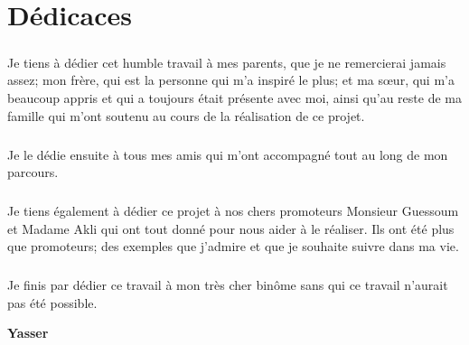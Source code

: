 \chapter*{Dédicaces}    

\vspace{1.5cm}

\paragraph{}
Je tiens à dédier cet humble travail à mes parents, que je ne remercierai jamais assez; mon frère, qui est la personne qui m'a inspiré le plus; et ma s\oe{}ur, qui m'a beaucoup appris et qui a toujours était présente avec moi, ainsi qu'au reste de ma famille qui m'ont soutenu au cours de la réalisation de ce projet. 
\paragraph{}
Je le dédie ensuite à tous mes amis qui m'ont accompagné tout au long de mon parcours. 
\paragraph{}
Je tiens également à dédier ce projet à nos chers promoteurs Monsieur Guessoum et Madame Akli qui ont tout donné pour nous aider à le réaliser. Ils ont été plus que promoteurs; des exemples que j'admire et que je souhaite suivre dans ma vie.
\paragraph{}
Je finis par dédier ce travail à mon très cher binôme sans qui ce travail n'aurait pas été possible.

\vspace{0.5cm}
\begin{center}
	\Large
	\hspace{12.5cm}
	\textbf{Yasser}
\end{center}